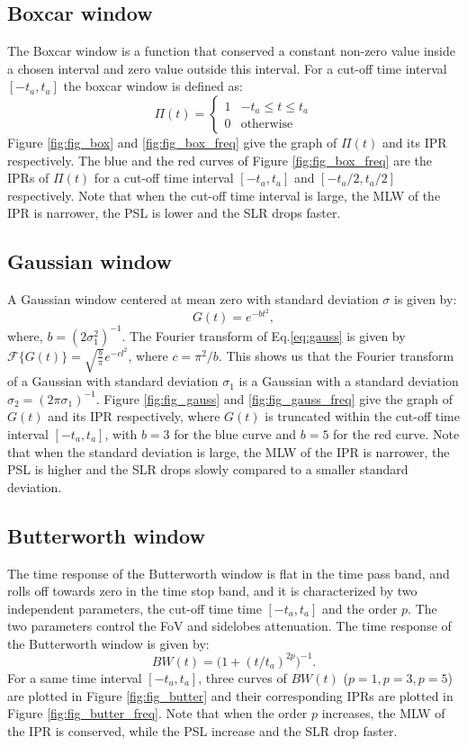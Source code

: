 \documentclass[useAMS,usenatbib]{mn2e}
\begin{document}
\subsection{Boxcar window}
The Boxcar window is a function that  conserved a constant non-zero value  inside a chosen  interval and zero value outside this interval. 
For a cut-off time interval  $[-t_a,t_a]$ the boxcar window is defined as:
\begin{equation}
\Pi(t)=\left\{
\begin{array}{rl}
1 & \mbox{$-t_a \leq t \leq t_a$} \\
0 & \mbox{otherwise}
\end{array}\right.
\end{equation}
Figure \ref{fig:fig_box} and \ref{fig:fig_box_freq} give the graph of $\Pi(t)$ and its IPR  respectively. The blue and 
the red curves of Figure \ref{fig:fig_box_freq} are the IPRs of $\Pi(t)$ for a cut-off time interval $[-t_a, t_a]$ and 
$[-t_a/2,t_a/2]$ respectively. Note that when the cut-off time interval is large, the MLW of the IPR is 
narrower, the PSL is lower and the SLR drops faster.
\subsection{Gaussian window}
A Gaussian window centered at mean zero with standard deviation $\sigma$ is given by: 
\begin{equation}
  G(t)= e^{-bt^{2}}, \label{eq:gauss}
\end{equation}
where, $b=(2\sigma_1^2)^{-1}$. The  Fourier transform of Eq.\ref{eq:gauss} is given by 
$\mathcal{F}\big\{G(t)\big\}=\sqrt{\frac{b}{\pi}}e^{-cl^2}$, where $c=\pi^2/b$.
This shows us that the Fourier transform of a Gaussian with standard deviation $\sigma_1$ is a Gaussian with a standard 
deviation $\sigma_2= (2\pi\sigma_1)^{-1}$.
Figure \ref{fig:fig_gauss} and \ref{fig:fig_gauss_freq} give the graph of $G(t)$ and its IPR respectively, where $G(t)$ 
is truncated within the cut-off time interval $[-t_a,t_a]$, with $b = 3$ for the blue curve and $b=5$ for the red curve. Note 
that when the standard deviation is large, the MLW of the IPR is narrower, the PSL is higher and the SLR drops slowly compared to a 
smaller standard deviation.
\subsection{Butterworth window}
The time response of the Butterworth window is flat  in the time pass band, and rolls off towards zero in the time stop band, and it is 
characterized by two independent parameters, the cut-off time time $[-t_a,t_a]$ and the order $p$. The two parameters control the 
FoV and sidelobes  attenuation. The time response of the Butterworth window is given by:
\begin{equation}
BW(t)= \Big(1 + (t/t_a)^{2p}\Big)^{-1}.
\end{equation}
For a same time interval $[-t_a,t_a]$, three curves of $BW(t)$ ($p=1, p=3, p=5$) are plotted  in Figure \ref{fig:fig_butter} and 
their corresponding IPRs are plotted in Figure \ref{fig:fig_butter_freq}. Note that when the order $p$ increases, the MLW of the 
IPR is conserved, while the PSL increase and the SLR drop faster.
\end{document}
